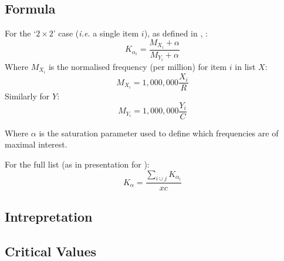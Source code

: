 \documentclass[11pt]{article}
\begin{document}
\subsection{Formula}
For the `$2\times 2$' case (\textsl{i.e.} a single item $i$), as defined in \cite{kilgarriff2009simple}, \cite{kilgarriff2012getting}:
$$
K_{\alpha_i} = \frac{ M_{X_i} + \alpha }{ M_{Y_i} + \alpha }
$$
Where $M_{X_i}$ is the normalised frequency (per million) for item $i$ in list $X$:
$$
M_{X_i} = 1,000,000\frac{ X_i }{ R }
$$
Similarly for $Y$:
$$
M_{Y_i}= 1,000,000\frac{ Y_i }{ C }
$$

Where $\alpha$ is the saturation parameter used to define which frequencies are of maximal interest.

For the full list (as in presentation for \cite{kilgarriff2012getting}):
$$
K_{\alpha} = \frac{ \sum_{i \cup j}{ K_{\alpha_i} } }{ xc } 
$$

\subsection{Intrepretation}

\subsection{Critical Values}
\end{document}
